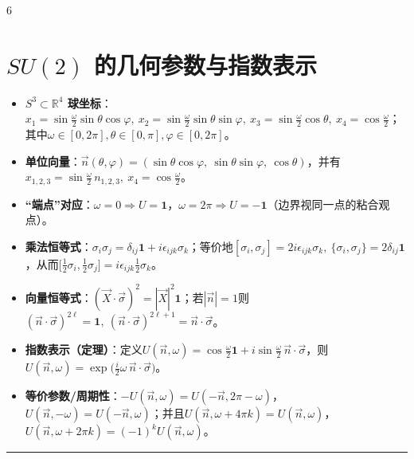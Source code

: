 \documentclass[landscape]{article}
\begin{document}
\begin{multicols*}{6}
\section*{$SU(2)$ 的几何参数与指数表示}
\begin{itemize}
  \item \textbf{$S^3\subset\mathbb{R}^4$ 球坐标}：$x_1=\sin\frac{\omega}{2}\sin\theta\cos\varphi,\ x_2=\sin\frac{\omega}{2}\sin\theta\sin\varphi,\ x_3=\sin\frac{\omega}{2}\cos\theta,\ x_4=\cos\frac{\omega}{2}$；其中$\omega\in[0,2\pi],\theta\in[0,\pi],\varphi\in[0,2\pi]$。
  \item \textbf{单位向量}：$\vec n(\theta,\varphi)=(\sin\theta\cos\varphi,\ \sin\theta\sin\varphi,\ \cos\theta)$，并有$x_{1,2,3}=\sin\frac{\omega}{2}\,n_{1,2,3},\ x_4=\cos\frac{\omega}{2}$。
  \item \textbf{“端点”对应}：$\omega=0\Rightarrow U=\mathbf{1}$，$\omega=2\pi\Rightarrow U=-\mathbf{1}$（边界视同一点的粘合观点）。
  \item \textbf{乘法恒等式}：$\sigma_i\sigma_j=\delta_{ij}\mathbf{1}+i\epsilon_{ijk}\sigma_k$；等价地$[\sigma_i,\sigma_j]=2i\epsilon_{ijk}\sigma_k,\ \{\sigma_i,\sigma_j\}=2\delta_{ij}\mathbf{1}$，从而$\big[\tfrac12\sigma_i,\tfrac12\sigma_j\big]=i\epsilon_{ijk}\tfrac12\sigma_k$。
  \item \textbf{向量恒等式}：$(\vec X\cdot\vec\sigma)^2=|\vec X|^2\mathbf{1}$；若$|\vec n|=1$则$(\vec n\cdot\vec\sigma)^{2\ell}=\mathbf{1},\ (\vec n\cdot\vec\sigma)^{2\ell+1}=\vec n\cdot\vec\sigma$。
  \item \textbf{指数表示（定理）}：定义$U(\vec n,\omega)=\cos\frac{\omega}{2}\mathbf{1}+i\sin\frac{\omega}{2}\,\vec n\cdot\vec\sigma$，则$U(\vec n,\omega)=\exp\!\big(\tfrac{i}{2}\omega\,\vec n\cdot\vec\sigma\big)$。
  \item \textbf{等价参数/周期性}：$-U(\vec n,\omega)=U(-\vec n,2\pi-\omega)$，$U(\vec n,-\omega)=U(-\vec n,\omega)$；并且$U(\vec n,\omega+4\pi k)=U(\vec n,\omega)$，$U(\vec n,\omega+2\pi k)=(-1)^kU(\vec n,\omega)$。
\end{itemize}
\noindent\textcolor{blue}{\rule{\linewidth}{1pt}}

\end{multicols*}
\end{document}
